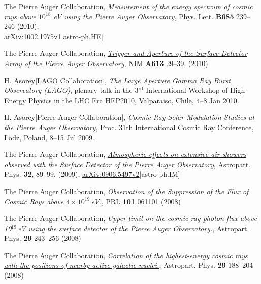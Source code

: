 \begin{etaremune}
\item {}The Pierre Auger Collaboration,
\href{http://dx.doi.org/10.1016/j.physletb.2010.02.013}{\emph{Measurement of
the energy spectrum of cosmic rays above $10^{18}$ eV using the Pierre Auger
Observatory}}, Phys. Lett. {\bf B685} 239--246 (2010),\\
\href{http://arxiv.org/abs/1002.1975}{arXiv:1002.1975v1}[astro-ph.HE]

\item {}The Pierre Auger Collaboration,
\href{http://dx.doi.org/10.1016/j.nima.2009.11.018}{\emph{Trigger and Aperture
of the Surface Detector Array of the Pierre Auger Observatory}}, NIM {\bf A613}
29--39, (2010)

\item {}H. Asorey[LAGO Collaboration], {\emph{The Large Aperture Gamma Ray
Burst Observatory (LAGO)}}, plenary talk in the 3$^{\mathrm{rd}}$ International Workshop of
High Energy Physics in the LHC Era HEP2010, Valparaiso, Chile, 4--8 Jan 2010.

\item {}H. Asorey[Pierre Auger Collaboration], {\emph{Cosmic Ray Solar
Modulation Studies at the Pierre Auger Observatory}}, \en Proc. 31th
International Cosmic Ray Conference, Lodz, Poland, 8--15 Jul 2009.

\item {} The Pierre Auger Collaboration,
\href{http://dx.doi.org/10.1016/j.astropartphys.2009.06.004}{\emph{Atmospheric
effects on extensive air showers observed with the Surface Detector of the
Pierre Auger Observatory}}, Astropart. Phys. {\bf 32}, 89--99, (2009),
\href{http://arxiv.org/abs/0906.5497/}{arXiv:0906.5497v2}[astro-ph.IM]

\item {}The Pierre Auger Collaboration,
\href{http://dx.doi.org/10.1103/PhysRevLett.101.061101}{\emph{Observation of
the Suppression of the Flux of Cosmic Rays above $4\times10^{19}$\,eV.}}, PRL
{\bf 101} 061101 (2008)

\item {}The Pierre Auger Collaboration,
\href{http://dx.doi.org/10.1016/j.astropartphys.2008.01.003}{\emph{Upper limit
on the cosmic-ray photon flux above 10$^{19}$\,eV using the surface detector of
the Pierre Auger Observatory.}}, Astropart. Phys. {\bf 29} 243--256 (2008)

\item {}The Pierre Auger Collaboration,
\href{http://dx.doi.org/10.1016/j.astropartphys.2008.01.002}{\emph{Correlation
of the highest-energy cosmic rays with the positions of nearby active galactic
nuclei.}}, Astropart. Phys. {\bf 29} 188--204 (2008)


\end{etaremune}
